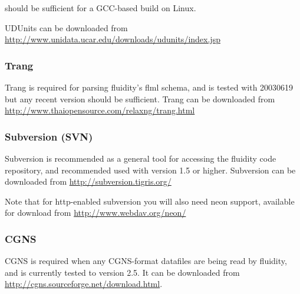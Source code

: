 should be sufficient for a GCC-based build on Linux.

UDUnits can be downloaded from \url{http://www.unidata.ucar.edu/downloads/udunits/index.jsp}

\subsubsection{Trang}
\label{sect:required_libraries_supporting_trang}

Trang is required for parsing fluidity's flml schema, and is tested with
20030619 but any recent version should be sufficient. Trang can be downloaded
from \url{http://www.thaiopensource.com/relaxng/trang.html}

\subsubsection{Subversion (SVN)}
\label{sect:required_libraries_supportingsvn}

Subversion is recommended as a general tool for accessing the fluidity code
repository, and recommended used with version 1.5 or higher. Subversion can be
downloaded from \url{http://subversion.tigris.org/}

Note that for http-enabled subversion you will also need neon support,
available for download from \url{http://www.webdav.org/neon/}

\subsubsection{CGNS}
\label{sect:required_libraries_supporting_cgns}

CGNS is required when any CGNS-format datafiles are being read by fluidity, and
is currently tested to version 2.5. It can be downloaded from 
\url{http://cgns.sourceforge.net/download.html}.
